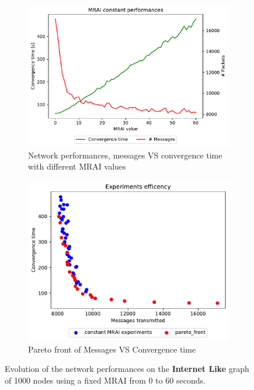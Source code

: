 \begin{figure}[h]
     \centering
     \begin{subfigure}[b]{0.45\textwidth}
         \centering
         \includegraphics[width=\textwidth]{images/internet_like/1000/constantMRAI/internet_like-constant_mrai_evolution.pdf}
		 \caption{Network performances, messages VS convergence time with different
			\ac{MRAI} values}
         \label{fig:internet_like_1000_constant_evolution_evolution}
     \end{subfigure}
     \hfill
     \begin{subfigure}[b]{0.45\textwidth}
         \centering
         \includegraphics[width=\textwidth]{images/internet_like/1000/constantMRAI/internet_like-constant.pdf}
		 \caption{Pareto front of Messages VS Convergence time}
         \label{fig:internet_like_1000_constant_evolution_paretoFront}
     \end{subfigure}
		\caption{Evolution of the network performances on the \textbf{Internet Like} graph
			of \num{1000} nodes using a fixed \ac{MRAI} from \num{0} to \num{60} seconds.}
        \label{fig:internet_like_1000_constant_evolution}
\end{figure}


